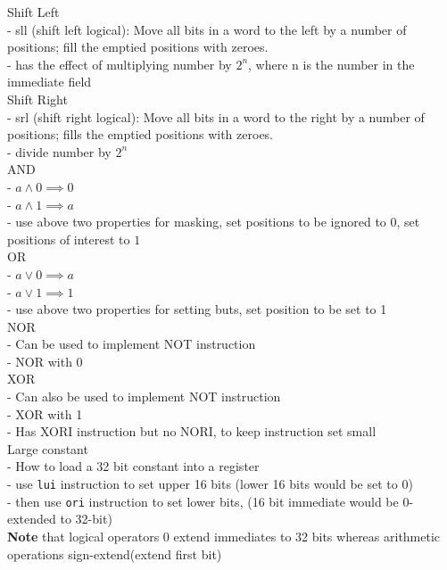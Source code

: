 \documentclass[10pt, a4paper]{article}
\newcommand{\highlight}[1]{{\color{red}\textbf{#1}}}
\begin{document}
\begin{multicols*}{3}
		Shift Left\\
		- sll (shift left logical): Move all bits in a word to the left by a number of positions; fill the emptied positions with zeroes.\\
		- has the effect of multiplying number by $2^n$, where n is the number in the immediate field\\
		
		Shift Right\\
		- srl (shift right logical): Move all bits in a word to the right by a number of positions; fills the emptied positions with zeroes.\\
		- divide number by $2^n$\\
		
		AND\\
		- $a \wedge 0 \implies 0$\\
		- $a \wedge 1 \implies a$\\
		- use above two properties for masking, set positions to be ignored to $0$, set positions of interest to $1$\\
		OR\\
		- $a \lor 0  \implies a$\\
		- $a \lor 1 \implies 1$\\
		- use above two properties for setting buts, set position to be set to 1\\
		
		NOR\\
		- Can be used to implement NOT instruction\\
		- NOR with 0\\		
		
		XOR\\
		- Can also be used to implement NOT instruction\\
		- XOR with 1\\
		- Has XORI instruction but no NORI, to keep instruction set small\\
		
		Large constant\\
		- How to load a 32 bit constant into a register\\
		- use \texttt{lui} instruction to set upper 16 bits (lower 16 bits would be set to 0)\\
		- then use \texttt{ori} instruction to set lower bits, (16 bit immediate would be 0-extended to 32-bit)\\
		\highlight{Note} that logical operators 0 extend immediates to 32 bits whereas arithmetic operations sign-extend(extend first bit)\\


\end{multicols*}
\end{document}
